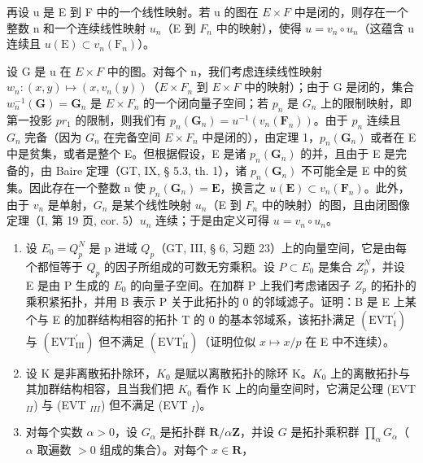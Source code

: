 再设 u 是 E 到 F 中的一个线性映射。若 u 的图在 \(E \times F\) 中是闭的，则存在一个整数 n 和一个连续线性映射 \(u_{n}\)（E 到 \(F_{n}\) 中的映射），使得 \(u = v_{n} \circ u_{n}\)（这蕴含 u 连续且 \(u(\mathrm{E}) \subset v_{n}(\mathrm{F}_{n})\)）。

设 G 是 u 在 \(E \times F\) 中的图。对每个 n，我们考虑连续线性映射 \(w_{n}:(x,y)\mapsto(x,v_{n}(y))\)（\(E \times F_{n}\) 到 \(E \times F\) 中的映射）；由于 G 是闭的，集合 \(w_{n}^{-1}(\mathbf{G})=\mathbf{G}_{n}\) 是 \(E \times F_{n}\) 的一个闭向量子空间；若 \(p_{n}\) 是 \(G_{n}\) 上的限制映射，即第一投影 \(pr_{1}\) 的限制，则我们有 \(p_{n}(\mathbf{G}_{n})=u^{-1}(v_{n}(\mathbf{F}_{n}))\)。由于 \(p_{n}\) 连续且 \(G_{n}\) 完备（因为 \(G_{n}\) 在完备空间 \(E \times F_{n}\) 中是闭的），由定理 1，\(p_{n}(\mathbf{G}_{n})\) 或者在 E 中是贫集，或者是整个 E。但根据假设，E 是诸 \(p_{n}(\mathbf{G}_{n})\) 的并，且由于 E 是完备的，由 Baire 定理（GT, IX, § 5.3, th. 1），诸 \(p_{n}(\mathbf{G}_{n})\) 不可能全是 E 中的贫集。因此存在一个整数 n 使 \(p_{n}(\mathbf{G}_{n}) = \mathbf{E}\)，换言之 \(u(\mathbf{E}) \subset v_{n}(\mathbf{F}_{n})\)。此外，由于 \(v_{n}\) 是单射，\(G_{n}\) 是某个线性映射 \(u_{n}\)（E 到 \(F_{n}\) 中的映射）的图，且由闭图像定理（I, 第 19 页, cor. 5）\(u_{n}\) 连续；于是由定义可得 \(u = v_{n} \circ u_{n}\)。

\exercisesheading

\exercisegroup

\begin{enumerate}
\def\labelenumi{\arabic{enumi})}
\item
  设 \(E_{0}=Q_{p}^{N}\) 是 p 进域 \(Q_{p}\)（GT, III, § 6, 习题 23）上的向量空间，它是由每个都恒等于 \(Q_{p}\) 的因子所组成的可数无穷乘积。设 \(P\subset E_{0}\) 是集合 \(Z_{p}^{N}\)，并设 E 是由 P 生成的 \(E_{0}\) 的向量子空间。在加群 P 上我们考虑诸因子 \(Z_{p}\) 的拓扑的乘积紧拓扑，并用 B 表示 P 关于此拓扑的 0 的邻域滤子。证明：B 是 E 上某个与 E 的加群结构相容的拓扑 T 的 0 的基本邻域系，该拓扑满足 \((\mathrm{EVT}_{\mathrm{I}}^{\prime})\) 与 \((\mathrm{EVT}_{\mathrm{III}}^{\prime})\) 但不满足 \((\mathrm{EVT}_{\mathrm{II}}^{\prime})\)（证明位似 \(x\mapsto x/p\) 在 E 中不连续）。
\item
  设 K 是非离散拓扑除环，\(K_{0}\) 是赋以离散拓扑的除环 K。\(K_{0}\) 上的离散拓扑与其加群结构相容，且当我们把 \(K_{0}\) 看作 K 上的向量空间时，它满足公理 (EVT \(_{II}\)) 与 (EVT \(_{III}\)) 但不满足 (EVT \(_{I}\))。
\item
  对每个实数 \(\alpha > 0\)，设 \(G_{\alpha}\) 是拓扑群 \(\mathbf{R} / \alpha \mathbf{Z}\)，并设 \(G\) 是拓扑乘积群 \(\prod_{\alpha} G_{\alpha}\)（\(\alpha\) 取遍数 \(>0\) 组成的集合）。对每个 \(x \in \mathbf{R}\)，
\end{enumerate}

